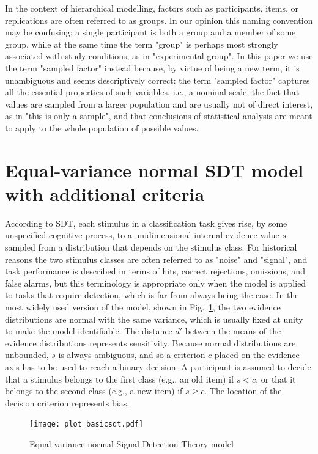 \documentclass[a4paper,man,apacite,floatsintext]{apa6}
\begin{document}
In the context of hierarchical modelling, factors such as
participants, items, or replications are often referred to as
groups. In our opinion this naming convention may be confusing; a
single participant is both a group and a member of some group, while
at the same time the term "group" is perhaps most strongly associated
with study conditions, as in "experimental group". In this paper we
use the term "sampled factor" instead because, by virtue of being a
new term, it is unambiguous and seems descriptively correct: the term
"sampled factor" captures all the essential properties of such
variables, i.e., a nominal scale, the fact that values are sampled
from a larger population and are usually not of direct interest, as in
"this is only a sample", and that conclusions of statistical analysis
are meant to apply to the whole population of possible values.

\section{Equal-variance normal SDT model with additional criteria}

According to SDT, each stimulus in a classification task gives rise,
by some unspecified cognitive process, to a unidimensional internal
evidence value $s$ sampled from a distribution that depends on the
stimulus class. For historical reasons the two stimulus classes are
often referred to as "noise" and "signal", and task performance is
described in terms of hits, correct rejections, omissions, and false
alarms, but this terminology is appropriate only when the model is
applied to tasks that require detection, which is far from always
being the case. In the most widely used version of the model, shown in
Fig.~\ref{basicsdt}, the two evidence distributions are normal with
the same variance, which is usually fixed at unity to make the model
identifiable. The distance $d'$ between the means of the evidence
distributions represents sensitivity. Because normal distributions are
unbounded, $s$ is always ambiguous, and so a criterion $c$ placed on
the evidence axis has to be used to reach a binary decision. A
participant is assumed to decide that a stimulus belongs to the first
class (e.g., an old item) if $s < c$, or that it belongs to the second
class (e.g., a new item) if $s \geq c$. The location of the decision
criterion represents bias.

\begin{figure}[H]
  \centering
  \texttt{[image: plot\_basicsdt.pdf]}
  \caption{Equal-variance normal Signal Detection Theory model}
  \label{basicsdt}
\end{figure}
\end{document}
